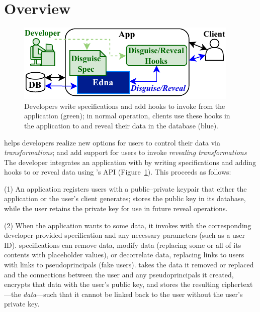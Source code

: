 \section{Overview}

\begin{figure}[t!]
  \centering
    \includegraphics{figs/edna_overview}
    \caption{Developers write \xx specifications and add hooks to invoke \sys
        from the application (green); in normal operation, clients use these
        hooks in the application to \xx and reveal their data in the database
        (blue).
    }
  \label{f:edna-overview}
\end{figure}
%
\sys helps developers realize new options for users to control their data
via \emph{\xxing transformations}; and add support for users to invoke
\emph{revealing transformations}
%
The developer integrates an application with \sys by writing \xx specifications
and adding hooks to \xx or reveal data using \sys's API
(Figure~\ref{f:edna-overview}).
%
This proceeds as follows:
%

%
(1) An application registers users with a public--private keypair
that either the application or the user's client generates; \sys stores the
public key in its database, while the user retains the private key for use in
future reveal operations.
%

%
(2) When the application wants to \xx some data, it invokes \sys with the
corresponding developer-provided \xx specification and any necessary
parameters (such as a user ID).
%
\Xx specifications can remove data, modify data (replacing some or all of its
contents with placeholder values), or decorrelate data, replacing
links to users with links to pseudoprincipals (fake users).
%
%
\sys takes the data it removed or replaced and the connections between
the user and any pseudoprincipals it created, encrypts that data with the user's
public key, and stores the resulting ciphertext---the \emph{\xxed
data}---such that it cannot be linked back to the user without the user's
private key.
%
%

